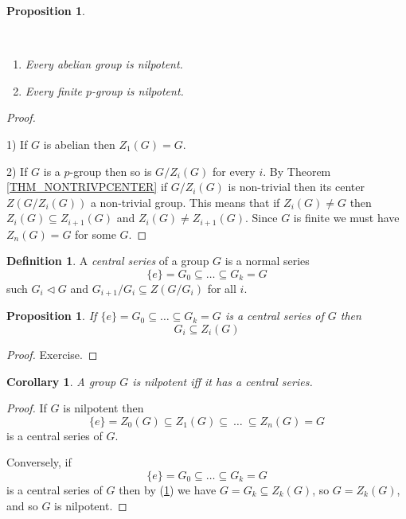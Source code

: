\documentclass[12pt, letterpaper, oneside]{article}
\theoremstyle{plain}
\newtheorem{proposition}[theorem]{Proposition}
\newtheorem{corollary}[theorem]{Corollary}
\theoremstyle{definition}
\newtheorem{definition}[theorem]{Definition}
\newcommand{\benu}{\begin{enumerate}}
\newcommand{\eenu}{\end{enumerate}}
\newcommand{\vs}{\vskip 5mm}
\newcommand{\isep}[1][0]{\setlength{\itemsep}{#1 mm}}
\begin{document}
\vs\vs

\begin{proposition}\ 
\label{PROP_ABPGPNILP}

\vskip -13mm 


\ 
\benu
\isep[-1]
\item Every abelian group is nilpotent. 
\item Every finite  $p$-group is nilpotent. 
\eenu
\end{proposition}

\vs

\begin{proof}\ 

1)  If $G$ is abelian then $Z_{1}(G) = G$. 

2) If $G$ is a $p$-group then  so is $G/Z_{i}(G)$ for every $i$. By Theorem \ref{THM_NONTRIVPCENTER}
if $G/Z_{i}(G)$ is non-trivial then its center $Z(G/Z_{i}(G))$ a non-trivial group. 
This means  that if $Z_{i}(G)\neq G$ then $Z_{i}(G) \subseteq Z_{i+1}(G)$ and $Z_{i}(G)\neq Z_{i+1}(G)$. 
Since $G$ is finite we must have $Z_{n}(G) = G$ for some $G$.
\end{proof}


\vs\vs

\begin{definition}
A \emph{central series} of a group $G$ is a normal series 
$$\{e\}= G_{0} \subseteq {\dots} \subseteq G_{k} = G$$
such $G_{i}\lhd G$ and $G_{i+1}/G_{i}\subseteq Z(G/G_{i})$ for all $i$.
\end{definition}

\vs\vs

\begin{proposition}
If $\{e\}= G_{0} \subseteq {\dots} \subseteq G_{k} = G$ is a central series of $G$ then  
$$G_{i} \subseteq Z_{i}(G)$$
\end{proposition}

\vs

\begin{proof}
Exercise.
\end{proof}


\vs\vs

\begin{corollary}
\label{COR_CENTRSERIES}
A group $G$ is nilpotent iff it has a central series. 
\end{corollary}

\vs

\begin{proof}
If $G$ is nilpotent then 
$$\{ e \} = Z_{0}(G) \subseteq Z_{1}(G) \subseteq\  \dots \ \subseteq Z_{n}(G) = G $$
is a central series of $G$. 

Conversely, if 
$$\{e\}= G_{0} \subseteq {\dots} \subseteq G_{k} = G$$
is a central series of $G$ then by (\ref{COR_CENTRSERIES}) we have $G = G_{k} \subseteq Z_{k}(G)$, 
so $G = Z_{k}(G)$, and so 
$G$ is nilpotent.
\end{proof}
\end{document}
